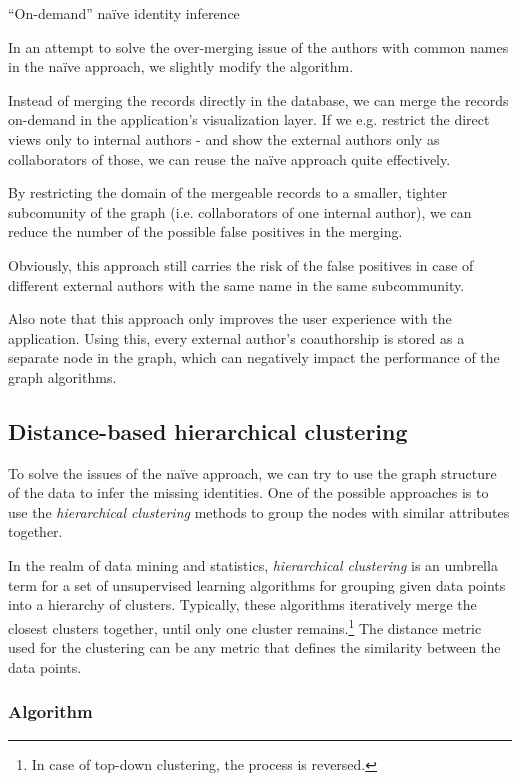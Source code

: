\begin{mybox}{``On-demand'' naïve identity inference}

In an attempt to solve the over-merging issue of the authors with common names in the naïve approach, we slightly modify the algorithm.

Instead of merging the records directly in the database, we can merge the records on-demand in the application's visualization layer.
If we e.g. restrict the direct views only to internal authors - and show the external authors only as collaborators of those,
we can reuse the naïve approach quite effectively.

By restricting the domain of the mergeable records to a smaller, tighter subcomunity of the graph (i.e. collaborators of one internal author), 
we can reduce the number of the possible false positives in the merging.

Obviously, this approach still carries the risk of the false positives in case of different external authors with the same name in the same subcommunity.

Also note that this approach only improves the user experience with the application.
Using this, every external author's coauthorship is stored as a separate node in the graph, which can negatively impact the performance of the graph algorithms.
\end{mybox}


\subsection{Distance-based hierarchical clustering}

To solve the issues of the naïve approach, we can try to use the graph structure of the data to infer the missing identities.
One of the possible approaches is to use the \textit{hierarchical clustering} methods to group the nodes with similar attributes together.

In the realm of data mining and statistics, \textit{hierarchical clustering} is an umbrella term for a set of unsupervised learning algorithms for grouping
given data points into a hierarchy of clusters. Typically, these algorithms iteratively merge the closest clusters together, until only one cluster remains.\footnote{In case of top-down clustering, the process is reversed.}
The distance metric used for the clustering can be any metric that defines the similarity between the data points.

\subsubsection{Algorithm}\label{sec:distance-based-hierarchical-clustering}

